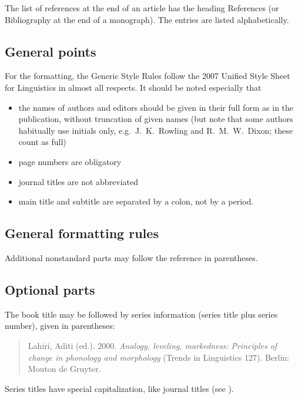 \documentclass[a4paper]{article}
\newenvironment{gsrexq}{\begin{quote}\color{blue}}{\end{quote}}
\newcommand{\gsrex}[1]{{\color{blue}#1}}
\begin{document}
The list of references at the end of an article has the heading
\gsrex{References} (or \gsrex{Bibliography} at the end of a monograph). The entries are
listed alphabetically.

\subsection{General points}\label{sec:general-points}

For the formatting, the Generic Style Rules follow the 2007 Unified
Style Sheet for Linguistics in almost all respects. It should be noted
especially that

\begin{itemize}
\item  the names of authors and editors should be given in their full form as in the publication, without truncation of given names (but note that some authors habitually use initials only, e.g.~\gsrex{J.~K.~Rowling} and \gsrex{R.~M.~W.~Dixon}; these count as full)
\item page numbers are obligatory
\item journal titles are not abbreviated
\item main title and subtitle are separated by a colon, not by a period.
\end{itemize}

\subsection{General formatting rules}\label{sec:general-formatting-rules}

Additional nonstandard parts may follow the reference in parentheses.

\subsection{Optional parts}\label{sec:optional-parts}

The book title may be followed by series information (series title plus
series number), given in parentheses: 
\begin{gsrexq}
Lahiri, Aditi (ed.). 2000. \textit{Analogy, leveling, markedness: Principles of change in phonology and morphology} (Trends in Linguistics 127). Berlin: Mouton de Gruyter.
\end{gsrexq}

Series titles have special capitalization, like journal titles (see ).
\end{document}
